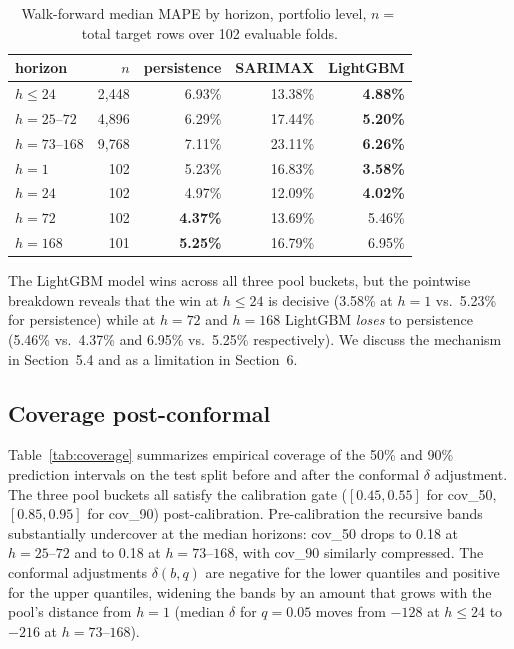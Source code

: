 \documentclass[11pt]{article}
\begin{document}
\begin{table}[t]
\centering
\caption{Walk-forward median MAPE by horizon, portfolio level, $n =$
total target rows over 102 evaluable folds.}
\label{tab:mape}
\small
\begin{tabular}{l r r r r}
\toprule
horizon & $n$ & persistence & SARIMAX & LightGBM \\
\midrule
$h \leq 24$    & 2{,}448 & 6.93\% & 13.38\% & \textbf{4.88\%} \\
$h = 25\text{--}72$  & 4{,}896 & 6.29\% & 17.44\% & \textbf{5.20\%} \\
$h = 73\text{--}168$ & 9{,}768 & 7.11\% & 23.11\% & \textbf{6.26\%} \\
\midrule
$h = 1$        &   102 & 5.23\% & 16.83\% & \textbf{3.58\%} \\
$h = 24$       &   102 & 4.97\% & 12.09\% & \textbf{4.02\%} \\
$h = 72$       &   102 & \textbf{4.37\%} & 13.69\% & 5.46\% \\
$h = 168$      &   101 & \textbf{5.25\%} & 16.79\% & 6.95\% \\
\bottomrule
\end{tabular}
\end{table}

The LightGBM model wins across all three pool buckets, but the pointwise
breakdown reveals that the win at $h \leq 24$ is decisive (3.58\% at
$h = 1$ vs.\ 5.23\% for persistence) while at $h = 72$ and $h = 168$
LightGBM \emph{loses} to persistence (5.46\% vs.\ 4.37\% and 6.95\% vs.\
5.25\% respectively). We discuss the mechanism in Section~5.4 and as a
limitation in Section~6.

\subsection{Coverage post-conformal}

Table~\ref{tab:coverage} summarizes empirical coverage of the 50\% and
90\% prediction intervals on the test split before and after the
conformal $\delta$ adjustment. The three pool buckets all satisfy the
calibration gate ($[0.45, 0.55]$ for cov\_50, $[0.85, 0.95]$ for
cov\_90) post-calibration. Pre-calibration the recursive bands
substantially undercover at the median horizons: cov\_50 drops to 0.18 at
$h = 25\text{--}72$ and to 0.18 at $h = 73\text{--}168$, with cov\_90
similarly compressed. The conformal adjustments
$\delta(b, q)$ are negative for the lower quantiles and positive for the
upper quantiles, widening the bands by an amount that grows with the
pool's distance from $h = 1$ (median $\delta$ for $q = 0.05$ moves from
$-128$ at $h \leq 24$ to $-216$ at $h = 73\text{--}168$).
\end{document}
